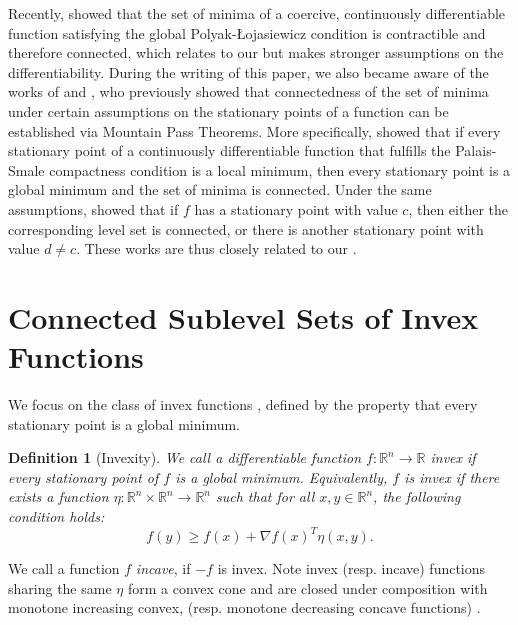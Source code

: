 \documentclass{article}
\newtheorem{definition}{Definition}[section]
\newcommand{\R}{\mathbb{R}}
\begin{document}
Recently, \citet{Criscitiello2025} showed that the set of minima of a coercive, continuously differentiable function satisfying the global Polyak-\L{}ojasiewicz condition is contractible and therefore connected, which relates to our  but makes stronger assumptions on the differentiability. During the writing of this paper, we also became aware of the works of \citet{Pucci1984Extensions} and \citet{Silva1998version}, who previously showed that connectedness of the set of minima under certain assumptions on the stationary points of a function can be established via Mountain Pass Theorems. More specifically, \citet{Pucci1984Extensions} showed that if every stationary point of a continuously differentiable function that fulfills the Palais-Smale compactness condition is a local minimum, then every stationary point is a global minimum and the set of minima is connected. Under the same assumptions, \citet{Silva1998version} showed that if $f$ has a stationary point with value $c$, then either the corresponding level set is connected, or there is another stationary point with value $d\neq c$. These works are thus closely related to our .



   











\section{Connected Sublevel Sets of Invex Functions}
\label{sec:sublevel}
We focus on the class of invex functions \citep{Hanson1981sufficiency}, defined by the property that every stationary point is a global minimum. 

\begin{definition}[Invexity]
    We call a differentiable function $f: \R^n \to \mathbb{R}$ \textit{invex} if every stationary point of $f$ is a global minimum. Equivalently, $f$ is invex if there exists a function $\eta: \R^n \times \R^n \to \mathbb{R}^n$ such that for all $x, y\in \R^n$, the following condition holds:
\[ f({y}) \geq f({x}) + \nabla f({x})^T \eta({x}, {y}). \]
\end{definition}

We call a function $f$ \textit{incave}, if $-f$ is invex. Note
invex (resp. incave) functions sharing the same $\eta$ form a convex cone and are closed under composition with monotone increasing convex, (resp. monotone decreasing concave functions) \citep{Mishra2008Invexity}.
\end{document}
